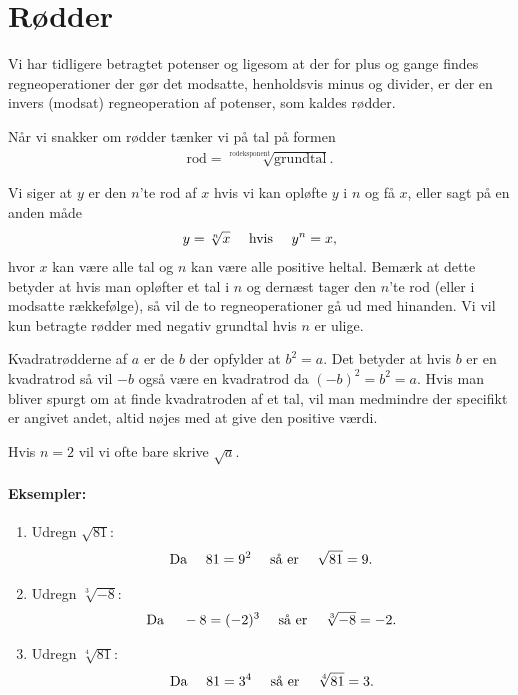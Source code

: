 \section{Rødder}
\noindent Vi har tidligere betragtet potenser og ligesom at der for plus og gange findes regneoperationer der gør det modsatte, henholdsvis minus og divider, er der en invers (modsat) regneoperation af potenser, som kaldes rødder. 

Når vi snakker om rødder tænker vi på tal på formen
\begin{align*}
\mathrm{rod} = \sqrt[\mathrm{rodeksponent}]{\mathrm{grundtal}}.
\end{align*}


Vi siger at $y$ er den $n$'te rod af $x$ hvis vi kan opløfte $y$ i $n$ og få $x$, eller sagt på en anden måde
\begin{align*}
y=\sqrt[n]{x} \quad \textup{ hvis } \quad  y^n=x,
\end{align*}
hvor $x$ kan være alle tal og $n$ kan være alle positive heltal. Bemærk at dette betyder at hvis man opløfter et tal i $n$ og dernæst tager den $n$'te rod (eller i modsatte rækkefølge), så vil de to regneoperationer gå ud med hinanden. Vi vil kun betragte rødder med negativ grundtal hvis $n$ er ulige.

Kvadratrødderne af $a$ er de $b$ der opfylder at $b^2=a$. Det betyder at hvis $b$ er en kvadratrod så vil $-b$ også være en kvadratrod da $(-b)^2=b^2=a$. Hvis man bliver spurgt om at finde kvadratroden af et tal, vil man medmindre der specifikt er angivet andet, altid nøjes med at give den positive værdi.

Hvis $n=2$ vil vi ofte bare skrive $\sqrt{a}$.
\paragraph*{Eksempler:}
\begin{enumerate}
\item Udregn $\sqrt{81}$:
\begin{align*}
\textup{Da } \quad 81=9^2 \quad \textup{ så er } \quad \sqrt{81}=9. 
\end{align*}
\item Udregn $\sqrt[3]{-8}$:
\begin{align*}
\textup{Da } \quad -8=(-2)^3 \quad \textup{ så er } \quad \sqrt[3]{-8}=-2. 
\end{align*}
\item Udregn $\sqrt[4]{81}$:
\begin{align*}
\textup{Da } \quad 81=3^4 \quad \textup{ så er } \quad \sqrt[4]{81}=3. 
\end{align*}
\end{enumerate}

